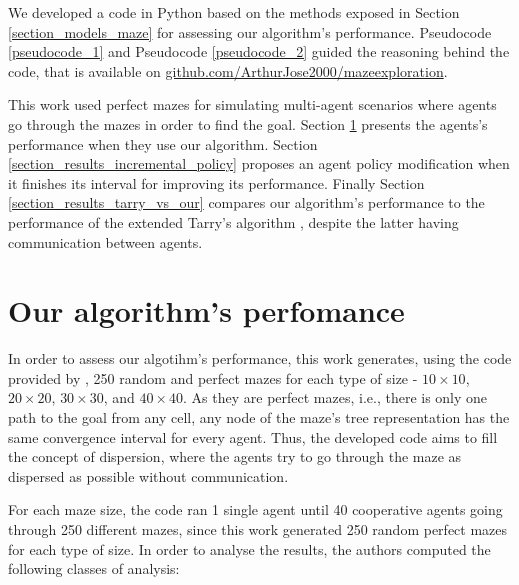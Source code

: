 \label{section_results}
We developed a code in Python based on the methods exposed in Section \ref{section_models_maze} for assessing our algorithm's performance. Pseudocode \ref{pseudocode_1} and Pseudocode \ref{pseudocode_2} guided the reasoning behind the code, that is available on \href{https://github.com/ArthurJose2000/mazeexploration}{github.com/ArthurJose2000/mazeexploration}.

This work used perfect mazes for simulating multi-agent scenarios where agents go through the mazes in order to find the goal. Section \ref{section_results_our_performance} presents the agents's performance when they use our algorithm. Section \ref{section_results_incremental_policy} proposes an agent policy modification when it finishes its interval for improving its performance. Finally Section \ref{section_results_tarry_vs_our} compares our algorithm's performance to the performance of the extended Tarry's algorithm \cite{KivelevitchCohen2010}, despite the latter having communication between agents.

\section{Our algorithm's perfomance}
\label{section_results_our_performance}

In order to assess our algotihm's performance, this work generates, using the code provided by , 250 random and perfect mazes for each type of size - $10 \times 10$, $20 \times 20$, $30 \times 30$, and $40 \times 40$. As they are perfect mazes, i.e., there is only one path to the goal from any cell, any node of the maze's tree representation has the same convergence interval for every agent. Thus, the developed code aims to fill the concept of dispersion, where the agents try to go through the maze as dispersed as possible without communication.

For each maze size, the code ran 1 single agent until 40 cooperative agents going through 250 different mazes, since this work generated 250 random perfect mazes for each type of size. In order to analyse the results, the authors computed the following classes of analysis:

